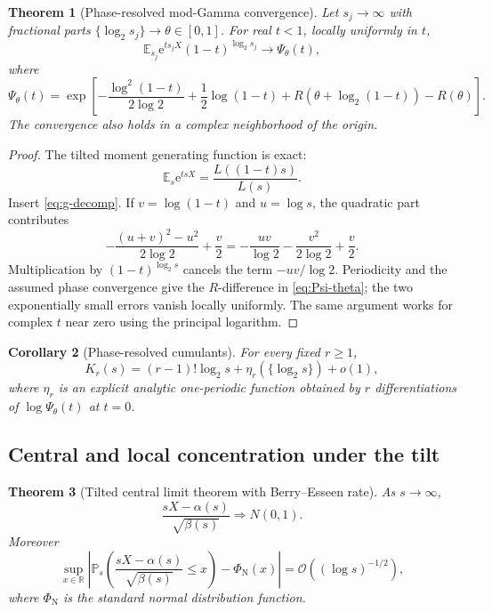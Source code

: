 \documentclass[11pt,oneside]{article}
\newtheorem{theorem}{Theorem}[section]
\newtheorem{corollary}[theorem]{Corollary}
\theoremstyle{definition}
\theoremstyle{remark}
\newcommand{\R}{\mathbb R}
\newcommand{\e}{\mathrm e}
\newcommand{\E}{\mathbb E}
\newcommand{\Prob}{\mathbb P}
\newcommand{\bigO}{\mathcal O}
\newcommand{\smallo}{o}
\begin{document}
\begin{theorem}[Phase-resolved mod-Gamma convergence]\label{thm:mod-gamma}
Let $s_j\to\infty$ with fractional parts
$\{\log_2s_j\}\to\theta\in[0,1]$.  For real $t<1$, locally uniformly in $t$,
\begin{equation}\label{eq:mod-gamma}
 \boxed{
 \E_{s_j}\e^{t s_jX}(1-t)^{\log_2s_j}
 \longrightarrow\Psi_\theta(t),}
\end{equation}
where
\begin{equation}\label{eq:Psi-theta}
 \boxed{
 \Psi_\theta(t)=\exp\!\left[
 -\frac{\log^2(1-t)}{2\log2}+\frac12\log(1-t)
 +R\!\left(\theta+\log_2(1-t)\right)-R(\theta)
 \right].}
\end{equation}
The convergence also holds in a complex neighborhood of the origin.
\end{theorem}

\begin{proof}
The tilted moment generating function is exact:
\begin{equation}\label{eq:tilted-mgf-ratio}
 \E_s\e^{tsX}=\frac{L((1-t)s)}{L(s)}.
\end{equation}
Insert \cref{eq:g-decomp}.  If $v=\log(1-t)$ and $u=\log s$, the quadratic
part contributes
\[
 -\frac{(u+v)^2-u^2}{2\log2}+\frac v2
 =-\frac{uv}{\log2}-\frac{v^2}{2\log2}+\frac v2.
\]
Multiplication by $(1-t)^{\log_2s}$ cancels the term $-uv/\log2$.  Periodicity
and the assumed phase convergence give the $R$-difference in
\cref{eq:Psi-theta}; the two exponentially small errors vanish locally
uniformly.  The same argument works for complex $t$ near zero using the
principal logarithm.
\end{proof}

\begin{corollary}[Phase-resolved cumulants]\label{cor:tilted-cumulants}
For every fixed $r\ge1$,
\begin{equation}\label{eq:Kr-asymp}
 K_r(s)=(r-1)!\log_2s+
 \eta_r(\{\log_2s\})+\smallo(1),
\end{equation}
where $\eta_r$ is an explicit analytic one-periodic function obtained by
$r$ differentiations of $\log\Psi_\theta(t)$ at $t=0$.
\end{corollary}

\subsection{Central and local concentration under the tilt}

\begin{theorem}[Tilted central limit theorem with Berry--Esseen rate]
\label{thm:tilted-CLT}
As $s\to\infty$,
\begin{equation}\label{eq:tilted-CLT}
 \frac{sX-\alpha(s)}{\sqrt{\beta(s)}}
 \Longrightarrow N(0,1).
\end{equation}
Moreover
\begin{equation}\label{eq:Berry-Esseen}
 \sup_{x\in\R}
 \left|\Prob_s\!\left(
 \frac{sX-\alpha(s)}{\sqrt{\beta(s)}}\le x\right)-\Phi_{\mathrm N}(x)\right|
 =\bigO\!\left((\log s)^{-1/2}\right),
\end{equation}
where $\Phi_{\mathrm N}$ is the standard normal distribution function.
\end{theorem}
\end{document}
